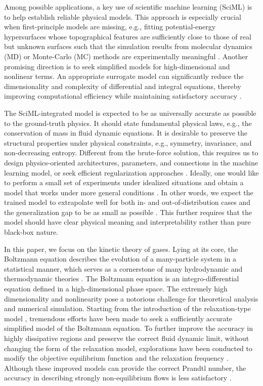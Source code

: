 \documentclass[preprint,3p,12pt,sort&compress]{elsarticle}
\begin{document}
Among possible applications, a key use of scientific machine learning (SciML) is to help establish reliable physical models.
This approach is especially crucial when first-principle models are missing, e.g.,
fitting potential-energy hypersurfaces whose topographical features are sufficiently close to those of real but unknown surfaces such that the simulation results from molecular dynamics (MD) or Monte-Carlo (MC) methods are experimentally meaningful \cite{raff2012neural,zhang2018deep}.
Another promising direction is to seek simplified models for high-dimensional and nonlinear terms.
An appropriate surrogate model can significantly reduce the dimensionality and complexity of differential and integral equations, thereby improving computational efficiency while maintaining satisfactory accuracy \cite{karniadakis2021physics,rackauckas2020universal}.

The SciML-integrated model is expected to be as universally accurate as possible to the ground-truth physics.
It should state fundamental physical laws, e.g., the conservation of mass in fluid dynamic equations.
It is desirable to preserve the structural properties under physical constraints, e.g., symmetry, invariance, and non-decreasing entropy.
Different from the brute-force solution, this requires us to design physics-oriented architectures, parameters, and connections in the machine learning model, or seek efficient regularization approaches \cite{greydanus2019hamiltonian,bekkers2019b,shuaibi2021rotation,schotthofer2022structure}.
Ideally, one would like to perform a small set of experiments under idealized situations and obtain a model that works under more general conditions \cite{han2020integrating}.
In other words, we expect the trained model to extrapolate well for both in- and out-of-distribution cases \cite{xu2020neural} and the generalization gap to be as small as possible \cite{shen2021towards}.
This further requires that the model should have clear physical meaning and interpretability rather than pure black-box nature.

In this paper, we focus on the kinetic theory of gases.
Lying at its core, the Boltzmann equation describes the evolution of a many-particle system in a statistical manner,
which serves as a cornerstone of many hydrodynamic and thermodynamic theories \cite{torrilhon2016modeling,eu1992kinetic}.
The Boltzmann equation is an integro-differential equation defined in a high-dimensional phase space.
The extremely high dimensionality and nonlinearity pose a notorious challenge for theoretical analysis and numerical simulation.
Starting from the introduction of the relaxation-type model \cite{bhatnagar1954model}, tremendous efforts have been made to seek a sufficiently accurate simplified model of the Boltzmann equation.
To further improve the accuracy in highly dissipative regions and preserve the correct fluid dynamic limit, without changing the form of the relaxation model, explorations have been conducted to modify the objective equilibrium function \cite{holway1966new,shakhov1968generalization} and the relaxation frequency \cite{mieussens2004numerical,haack2021consistent}.
Although these improved models can provide the correct Prandtl number, the accuracy in describing strongly non-equilibrium flows is less satisfactory \cite{shen2006rarefied}.
\end{document}
